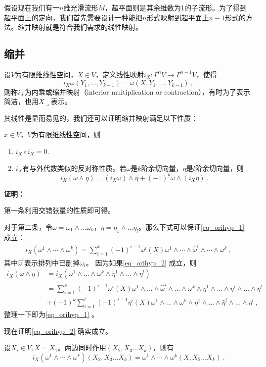 

\begin{issues}
\issueTODO
\end{issues}
假设现在我们有一$n$维光滑流形$M$，超平面则是其余维数为1的子流形。为了得到超平面上的定向，我们首先需要设计一种能把$n$形式映射到超平面上$n-1$形式的方法。缩并映射就是符合我们需求的线性映射。
\subsection{缩并}
\begin{definition}{}
设$V$为有限维线性空间，$X\in V$，定义线性映射$i_X:\Gamma^n V\rightarrow\Gamma^{n-1}V$，使得
\begin{equation}
i_X\omega(Y_1,\ldots,Y_{k-1})=\omega(X,Y_1,\ldots,Y_{k-1})~,
\end{equation}
则称$i_X$为内乘或缩并映射（interior multiplication or contraction），有时为了表示简洁，也用$X\lrcorner$表示。
\end{definition}
其线性是显而易见的，我们还可以证明缩并映射满足以下性质：
\begin{lemma}{}
$x\in V$，$V$为有限维线性空间，则
\begin{enumerate}
\item $i_X\circ i_X=0$.
\item $i_X$有与外代数类似的反对称性质。若$\omega$是$k$阶余切向量，$\eta$是$l$阶余切向量，则
\begin{equation}\label{eq_orihyp_1}
i_X(\omega\wedge\eta)=(i_X\omega)\wedge\eta+(-1)^k\omega\wedge(i_X\eta)~.
\end{equation}
\end{enumerate}
\end{lemma}
\textbf{证明：}

第一条利用交错张量的性质即可得。

对于第二条，令$\omega=\omega_1\wedge...\omega_k$，$\eta=\eta_1\wedge...\eta_l$。那么下式可以保证\autoref{eq_orihyp_1} 成立：
\begin{equation}\label{eq_orihyp_2}
\begin{aligned}
i_X(\omega^1\wedge\cdots\wedge\omega^k)=\sum_{i=1}^k(-1)^{i-1}\omega^i(X)\omega^1\wedge\cdots\wedge\hat{\omega}^i\wedge\cdots\wedge\omega^k~,
\end{aligned}
\end{equation}
其中$\hat\omega^i$表示排列中已删掉$\omega_i$。
因为如果\autoref{eq_orihyp_2} 成立，则
\begin{equation}
\begin{aligned}
i_X(\omega\wedge\eta)&=i_X(\omega^1\wedge...\wedge\omega^k\wedge\eta^1\wedge...\wedge\eta^l)\\
&=\sum_{i=1}^k(-1)^{i-1}\omega^{i}(X)\omega^1\wedge...\wedge\hat\omega^i\wedge...\wedge\omega^k\wedge\eta^1\wedge...\wedge\eta^i\wedge...\wedge\eta^l\\
&+(-1)^k\sum_{i=1}^l(-1)^{i-1}\eta^{i}(X)\omega^1\wedge...\wedge\omega^k\wedge\eta^1\wedge...\wedge\hat\eta^i\wedge...\wedge\eta^l~,
\end{aligned}
\end{equation}
整理一下即为\autoref{eq_orihyp_1} 。

现在证明\autoref{eq_orihyp_2} 确实成立。

设$X_i\in V,X=X_1$。两边同时作用$(X_2,X_3...X_k)$，则有
\begin{equation}
i_X(\omega^1\wedge\cdots\wedge\omega^k)(X_2,X_3...X_k)=\omega^1\wedge\cdots\wedge\omega^k(X,X_2...X_k)~.
\end{equation}